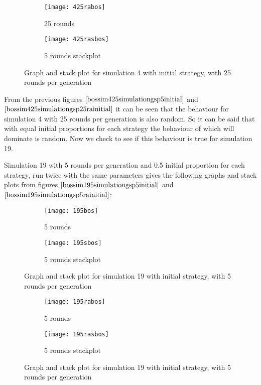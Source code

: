 \begin{figure}[H]       
    \centering
    \begin{subfigure}[b]{0.3\textwidth}
	\centering
	{\texttt{[image: 425rabos]}}   
    	\caption{25 rounds}
	\label{fig:bossim425rabos}
    \end{subfigure}
    \hfill
    \begin{subfigure}[b]{0.3\textwidth}
	\centering
	{\texttt{[image: 425rasbos]}}   
    	\caption{5 rounds stackplot}
	\label{fig:bossim425rasbos}
    \end{subfigure}
    \caption{Graph and stack plot for simulation 4 with initial strategy, with 25 rounds per generation}
    \label{bossim425simulationgsp25rainitial}
\end{figure}
From the previous figures $\ref{bossim425simulationgsp5initial}$ and $\ref{bossim425simulationgsp25rainitial}$ it can be seen that the behaviour for simulation 4 with 25 rounds per generation is also random. So it  can be said that with equal initial proportions for each strategy the behaviour of which will dominate is random. Now we check to  see if this behaviour is true for simulation 19. 

Simulation 19 with 5 rounds per generation and 0.5 initial proportion for each strategy, run twice with the same parameters gives the following graphs and stack plots from figures $\ref{bossim195simulationgsp5initial}$ and $\ref{bossim195simulationgsp5rainitial}$:
\begin{figure}[H]       
    \centering
    \begin{subfigure}[b]{0.3\textwidth}
	\centering
	{\texttt{[image: 195bos]}}   
    	\caption{5 rounds}
	\label{fig:bossim195r5}
    \end{subfigure}
    \hfill
    \begin{subfigure}[b]{0.3\textwidth}
	\centering
	{\texttt{[image: 195sbos]}}   
    	\caption{5 rounds stackplot}
	\label{fig:bossim195rs5}
    \end{subfigure}
    \caption{Graph and stack plot for simulation 19 with initial strategy, with 5 rounds per generation}
    \label{bossim195simulationgsp5initial}
\end{figure}

\begin{figure}[H]       
    \centering
    \begin{subfigure}[b]{0.3\textwidth}
	\centering
	{\texttt{[image: 195rabos]}}   
    	\caption{5 rounds}
	\label{fig:bossim195ra}
    \end{subfigure}
    \hfill
    \begin{subfigure}[b]{0.3\textwidth}
	\centering
	{\texttt{[image: 195rasbos]}}   
    	\caption{5 rounds stackplot}
	\label{fig:bossim195ras}
    \end{subfigure}
    \caption{Graph and stack plot for simulation 19 with initial strategy, with 5 rounds per generation}
    \label{bossim195simulationgsp5rainitial}
\end{figure}

